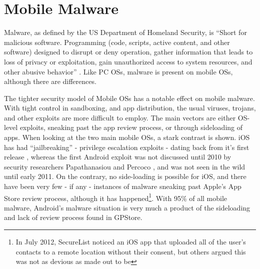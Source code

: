
\section{Mobile Malware}
Malware, as defined by the US Department of Homeland Security, is ``Short for malicious software. Programming (code, scripts, active content, and other software) designed to disrupt or deny operation, gather information that leads to loss of privacy or exploitation, gain unauthorized access to system resources, and other abusive behavior'' \citep{nash2005undirected}. Like PC OSs, malware is present on mobile OSs, although there are differences.


The tighter security model of Mobile OSs has a notable effect on mobile malware. With tight control in sandboxing, and app distribution, the usual viruses, trojans, and other exploits are more difficult to employ. The main vectors are either OS-level exploits, sneaking past the app review process, or through sideloading of apps. When looking at the two main mobile OSs, a stark contrast is shown. iOS has had  ``jailbreaking'' - privilege escalation exploits - dating back from it's first release \citep{damopoulos2011isam}, whereas the first Android exploit was not discussed until 2010 by security researchers Papathanasiou and Percoco \citep{papathanasiou2010not}, and was not seen in the wild until early 2011\citep{castillo2010android}. On the contrary, no side-loading is possible for iOS, and there have been very few - if any - instances of malware sneaking past Apple's App Store review process, although it has happened\footnote{In July 2012, SecureList noticed an iOS app that uploaded all of the user's contacts to a remote location without their consent\citep{SecureList2012}, but others argued this was not as devious as made out to be\citep{trendmicroios2012} }. With 95\% of all mobile malware\citep{nq2013}, Android's malware situation is very much a product of the sideloading and lack of review process found in GPStore\citep{nq2013}. %

